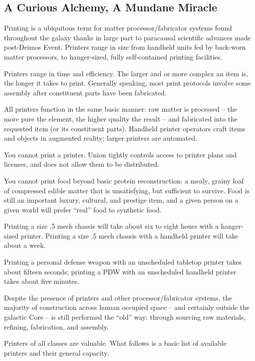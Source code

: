 \subsection{A Curious Alchemy, A Mundane Miracle}

Printing is a ubiquitous term for matter processor/fabricator systems found throughout the
galaxy thanks in large part to paracausal scientific advances made post-Deimos Event. Printers
range in size from handheld units fed by back-worn matter processors, to hanger-sized, fully
self-contained printing facilities.

Printers range in time and efficiency. The larger and or more complex an item is, the longer it
takes to print. Generally speaking, most print protocols involve some assembly after constituent
parts have been fabricated.

All printers function in the same basic manner: raw matter is processed -- the more pure the
element, the higher quality the result -- and fabricated into the requested item (or its constituent
parts). Handheld printer operators craft items and objects in augmented reality; larger printers
are automated.

You cannot print a printer. Union tightly controls access to printer plans and licenses, and does
not allow them to be distributed.

You cannot print food beyond basic protein reconstruction: a mealy, grainy loaf of compressed
edible matter that is unsatisfying, but sufficient to survive. Food is still an important luxury,
cultural, and prestige item, and a given person on a given world will prefer ``real'' food to
synthetic food.

Printing a size .5 mech chassis will take about six to eight hours with a hanger-sized printer.
Printing a size .5 mech chassis with a handheld printer will take about a week.

Printing a personal defense weapon with an unscheduled tabletop printer takes about fifteen
seconds; printing a PDW with an unscheduled handheld printer takes about five minutes.

Despite the presence of printers and other processor/fabricator systems, the majority of
construction across human occupied space -- and certainly outside the galactic Core -- is still
performed the ``old'' way: through sourcing raw materials, refining, fabrication, and assembly.

Printers of all classes are valuable. What follows is a basic list of available printers and their
general capacity.


